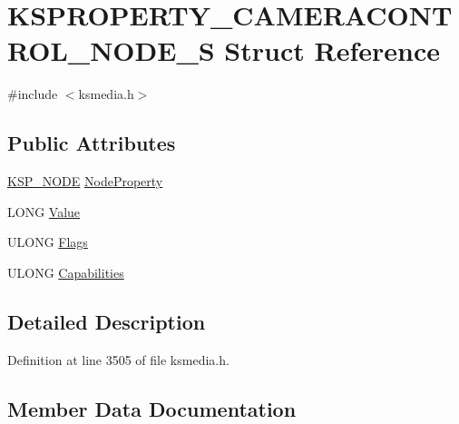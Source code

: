 \hypertarget{struct_k_s_p_r_o_p_e_r_t_y___c_a_m_e_r_a_c_o_n_t_r_o_l___n_o_d_e___s}{}\section{K\+S\+P\+R\+O\+P\+E\+R\+T\+Y\+\_\+\+C\+A\+M\+E\+R\+A\+C\+O\+N\+T\+R\+O\+L\+\_\+\+N\+O\+D\+E\+\_\+S Struct Reference}
\label{struct_k_s_p_r_o_p_e_r_t_y___c_a_m_e_r_a_c_o_n_t_r_o_l___n_o_d_e___s}


{\ttfamily \#include $<$ksmedia.\+h$>$}

\subsection*{Public Attributes}
\begin{DoxyCompactItemize}
\item 
\hyperlink{struct_k_s_p___n_o_d_e}{K\+S\+P\+\_\+\+N\+O\+DE} \hyperlink{struct_k_s_p_r_o_p_e_r_t_y___c_a_m_e_r_a_c_o_n_t_r_o_l___n_o_d_e___s_ad257a484e4a047d195f6058914e41fdc}{Node\+Property}
\item 
L\+O\+NG \hyperlink{struct_k_s_p_r_o_p_e_r_t_y___c_a_m_e_r_a_c_o_n_t_r_o_l___n_o_d_e___s_a5d69be3ad4c2f3482b68f895cfacba7d}{Value}
\item 
U\+L\+O\+NG \hyperlink{struct_k_s_p_r_o_p_e_r_t_y___c_a_m_e_r_a_c_o_n_t_r_o_l___n_o_d_e___s_ab1e2c529df57f70f85b058c9805479e2}{Flags}
\item 
U\+L\+O\+NG \hyperlink{struct_k_s_p_r_o_p_e_r_t_y___c_a_m_e_r_a_c_o_n_t_r_o_l___n_o_d_e___s_a2585d9525f3233d48f57a4e7eeb8f0a9}{Capabilities}
\end{DoxyCompactItemize}


\subsection{Detailed Description}


Definition at line 3505 of file ksmedia.\+h.



\subsection{Member Data Documentation}
